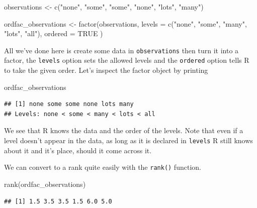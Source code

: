 \documentclass[
]{book}
\newenvironment{Shaded}{\begin{snugshade}}{\end{snugshade}}
\newcommand{\AttributeTok}[1]{\textcolor[rgb]{0.77,0.63,0.00}{#1}}
\newcommand{\ConstantTok}[1]{\textcolor[rgb]{0.00,0.00,0.00}{#1}}
\newcommand{\FunctionTok}[1]{\textcolor[rgb]{0.00,0.00,0.00}{#1}}
\newcommand{\NormalTok}[1]{#1}
\newcommand{\OtherTok}[1]{\textcolor[rgb]{0.56,0.35,0.01}{#1}}
\newcommand{\StringTok}[1]{\textcolor[rgb]{0.31,0.60,0.02}{#1}}
\begin{document}
\begin{Shaded}
\begin{Highlighting}[]
\NormalTok{observations }\OtherTok{\textless{}{-}} \FunctionTok{c}\NormalTok{(}\StringTok{"none"}\NormalTok{, }\StringTok{"some"}\NormalTok{, }\StringTok{"some"}\NormalTok{, }\StringTok{"none"}\NormalTok{, }\StringTok{"lots"}\NormalTok{, }\StringTok{"many"}\NormalTok{)}

\NormalTok{ordfac\_observations }\OtherTok{\textless{}{-}} \FunctionTok{factor}\NormalTok{(observations, }
                          \AttributeTok{levels =} \FunctionTok{c}\NormalTok{(}\StringTok{"none"}\NormalTok{, }\StringTok{"some"}\NormalTok{, }\StringTok{"many"}\NormalTok{, }\StringTok{"lots"}\NormalTok{, }\StringTok{"all"}\NormalTok{),}
                          \AttributeTok{ordered =} \ConstantTok{TRUE}
\NormalTok{                          )}
\end{Highlighting}
\end{Shaded}

All we've done here is create some data in \texttt{observations} then turn it into a factor, the \texttt{levels} option sets the allowed levels and the \texttt{ordered} option tells R to take the given order. Let's inspect the factor object by printing

\begin{Shaded}
\begin{Highlighting}[]
\NormalTok{ordfac\_observations}
\end{Highlighting}
\end{Shaded}

\begin{verbatim}
## [1] none some some none lots many
## Levels: none < some < many < lots < all
\end{verbatim}

We see that R knows the data and the order of the levels. Note that even if a level doesn't appear in the data, as long as it is declared in \texttt{levels} R still knows about it and it's place, should it come across it.

We can convert to a rank quite easily with the \texttt{rank()} function.

\begin{Shaded}
\begin{Highlighting}[]
\FunctionTok{rank}\NormalTok{(ordfac\_observations)}
\end{Highlighting}
\end{Shaded}

\begin{verbatim}
## [1] 1.5 3.5 3.5 1.5 6.0 5.0
\end{verbatim}
\end{document}
